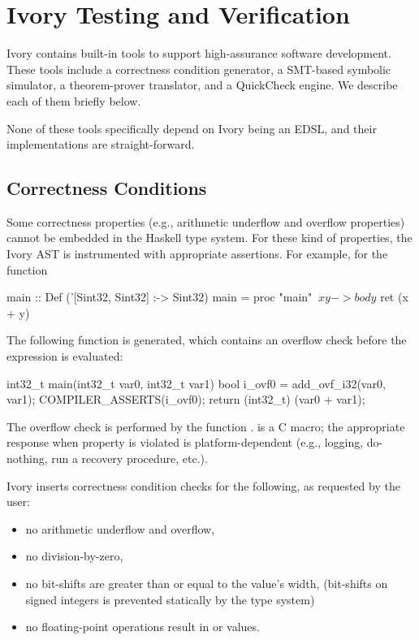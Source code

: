 \section{Ivory Testing and Verification}
\label{sec:tools}

Ivory contains built-in tools to support high-assurance software
development. These tools include a correctness condition generator, a SMT-based
symbolic simulator, a theorem-prover translator, and a QuickCheck engine. We
describe each of them briefly below.

None of these tools specifically depend on Ivory being an EDSL, and their
implementations are straight-forward.

\subsection{Correctness Conditions}
Some correctness properties (e.g., arithmetic underflow and overflow properties)
cannot be embedded in the Haskell type system. For these kind of properties, the
Ivory AST is instrumented with appropriate assertions. For example, for the
function

\begin{code}
main :: Def ('[Sint32, Sint32] :-> Sint32)
main = proc "main" $ \ x y -> body $
  ret (x + y)
\end{code}
\noindent
{}
The following function is generated, which contains an overflow check before the
expression is evaluated:
\begin{code}
int32_t main(int32_t var0, int32_t var1)
{
    bool i_ovf0 = add_ovf_i32(var0, var1);
    COMPILER_ASSERTS(i_ovf0);
    return (int32_t) (var0 + var1);
}
\end{code}
\noindent
The overflow check is performed by the function
.  is a C macro; the appropriate response when
property is violated is platform-dependent (e.g., logging, do-nothing, run a
recovery procedure, etc.).

Ivory inserts correctness condition checks for the following, as requested by
the user:
\begin{itemize}
\item no arithmetic underflow and overflow,
\item no division-by-zero,
\item no bit-shifts are greater than or equal to the value's width,
  (bit-shifts on signed integers is prevented statically by the type system)
\item no floating-point operations result in  or  values.
\end{itemize}

